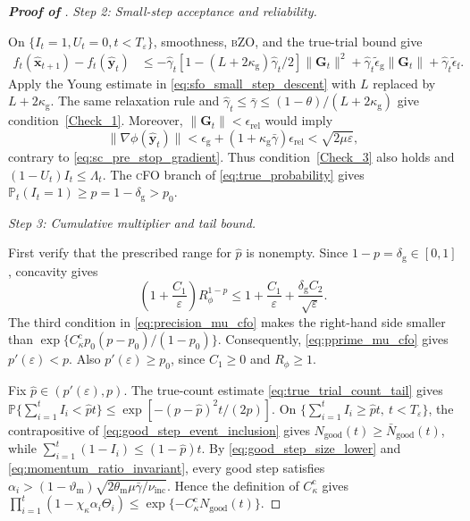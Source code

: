 \documentclass{article}
\begin{document}
\begin{proof}[\textbf{Proof of }]
\par\medskip
\noindent\emph{Step 2: Small-step acceptance and reliability.}
\par\nobreak
On \(\{I_t=1,U_t=0,t<T_\varepsilon\}\), smoothness,
\textsc{bZO}, and the true-trial bound give
\[
\begin{aligned}
f_t(\hat {\bm{x}}_{t+1})-f_t(\hat {\bm{y}}_t)
&\le-\hat\gamma_t[1-(L+2\kappa_{\mathrm{g}})\hat\gamma_t/2]
\|\mathbf{G}_t\|^2+\hat\gamma_t\widetilde\epsilon_{\mathrm{g}}\|\mathbf{G}_t\|
+\hat\gamma_t\widetilde\epsilon_{\mathrm{f}}.
\end{aligned}
\]
Apply the Young estimate in \eqref{eq:sfo_small_step_descent} with
\(L\) replaced by \(L+2\kappa_{\mathrm{g}}\). The same relaxation rule and
\(\hat\gamma_t\le\bar\gamma\le(1-\theta)/(L+2\kappa_{\mathrm{g}})\)
give condition~\eqref{Check_1}.
Moreover, \(\|\mathbf{G}_t\|<\epsilon_{\mathrm{rel}}\) would imply
\[
\|\nabla\phi(\hat {\bm{y}}_t)\|
<\epsilon_{\mathrm{g}}+(1+\kappa_{\mathrm{g}}\bar\gamma)\epsilon_{\mathrm{rel}}
<\sqrt{2\mu\varepsilon},
\]
contrary to \eqref{eq:sc_pre_stop_gradient}. Thus condition~\eqref{Check_3}
also holds and
\((1-U_t)I_t\le\Lambda_t\). The \textsc{cFO} branch of
\eqref{eq:true_probability} gives
\(\mathbb P_t(I_t=1)\ge p=1-\delta_{\mathrm{g}}>p_0\).

\par\medskip
\noindent\emph{Step 3: Cumulative multiplier and tail bound.}

First verify that the prescribed range for \(\hat p\) is nonempty.
Since \(1-p=\delta_{\mathrm{g}}\in[0,1]\), concavity gives
\[
\left(1+\frac{C_1}{\varepsilon}\right)R_\phi^{1-p}
\le1+\frac{C_1}{\varepsilon}
+\frac{\delta_{\mathrm{g}}C_2}{\sqrt\varepsilon}.
\]
The third condition in \eqref{eq:precision_mu_cfo} makes the right-hand
side smaller than
\(\exp\{C_\kappa^{\mathrm{c}}p_0(p-p_0)/(1-p_0)\}\).
Consequently, \eqref{eq:pprime_mu_cfo} gives
\(p'(\varepsilon)<p\). Also \(p'(\varepsilon)\ge p_0\), since
\(C_1\ge0\) and \(R_\phi\ge1\). 

Fix
\(\hat p\in(p'(\varepsilon),p)\). The true-count estimate \eqref{eq:true_trial_count_tail} gives
\(\mathbb P\{\sum_{i=1}^tI_i<\hat p t\}
\le\exp[-(p-\hat p)^2t/(2p)]\).
On
\(\{\sum_{i=1}^tI_i\ge\hat p t,\ t<T_\varepsilon\}\), the
contrapositive of \eqref{eq:good_step_event_inclusion} gives
\(N_{\mathrm{good}}(t)\ge\bar N_{\mathrm{good}}(t)\), while
\(\sum_{i=1}^t(1-I_i)\le(1-\hat p)t\). By
\eqref{eq:good_step_size_lower} and \eqref{eq:momentum_ratio_invariant},
every good step satisfies
\(\alpha_i>(1-\vartheta_{\mathrm{m}})
\sqrt{2\theta_{\mathrm{m}}\mu\bar\gamma/\nu_{\mathrm{inc}}}\).
Hence the definition of
\(C_\kappa^{\mathrm{c}}\) gives $\prod_{i=1}^t
(1-\chi_\kappa\alpha_i\Theta_i)
\le
\exp\{-C_\kappa^{\mathrm{c}}N_{\mathrm{good}}(t)\}$.


\end{proof}
\end{document}

